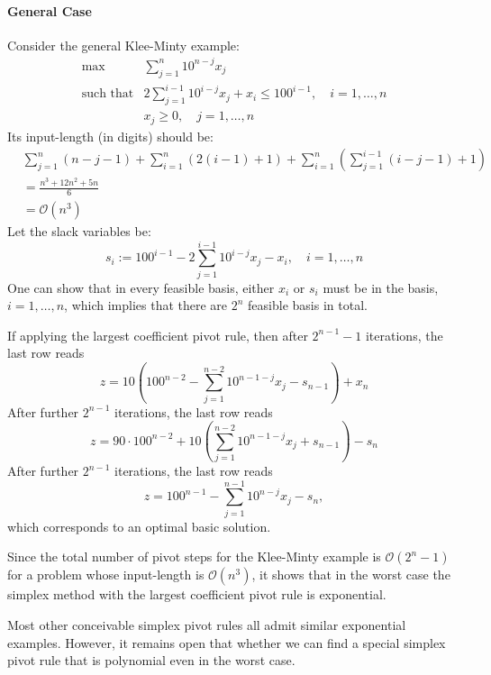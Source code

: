 \paragraph{General Case}
Consider the general Klee-Minty example:
\[
\begin{array}{ll}
\max&\sum_{j=1}^n10^{n-j}x_j\\
\mbox{such that}&2\sum_{j=1}^{i-1}10^{i-j}x_j+x_i\le100^{i-1},\quad i=1,\dots,n\\
&x_j\ge0,\quad j=1,\dots,n
\end{array}
\]
Its input-length (in digits) should be:
\begin{align*}
&\sum_{j=1}^n(n-j-1)+\sum_{i=1}^n(2(i-1) +1)+\sum_{i=1}^n\left(\sum_{j=1}^{i-1}(i-j-1)+1\right)\\
&=\frac{n^3+12n^2+5n}{6}\\
&=\mathcal{O}(n^3)
\end{align*}
Let the slack variables be:
\[
s_i:=100^{i-1}-2\sum_{j=1}^{i-1}10^{i-j}x_j-x_i,\quad i=1,\dots,n
\]
One can show that in every feasible basis, either $x_i$ or $s_i$ must be in the basis, $i=1,\dots,n$, which implies that there are $2^n$ feasible basis in total.

If applying the largest coefficient pivot rule, then after $2^{n-1}-1$ iterations, the last row reads
\[
z=10\left(100^{n-2}-\sum_{j=1}^{n-2}10^{n-1-j}x_j-s_{n-1}\right)+x_n
\]
After further $2^{n-1}$ iterations, the last row reads
\[
z=90\cdot100^{n-2}+10\left(\sum_{j=1}^{n-2}10^{n-1-j}x_j+s_{n-1}\right)-s_n
\]
After further $2^{n-1}$ iterations, the last row reads
\[
z=100^{n-1}-\sum_{j=1}^{n-1}10^{n-j}x_j-s_n,
\]
which corresponds to an optimal basic solution.
\begin{remark}
Since the total number of pivot steps for the Klee-Minty example is $\mathcal{O}(2^n-1)$ for a problem whose input-length is $\mathcal{O}(n^3)$, it shows that in the worst case the simplex method with the largest coefficient pivot rule is exponential.

Most other conceivable simplex pivot rules all admit similar exponential examples. However, it remains open that whether we can find a special simplex pivot rule that is polynomial even in the worst case.
\end{remark}

